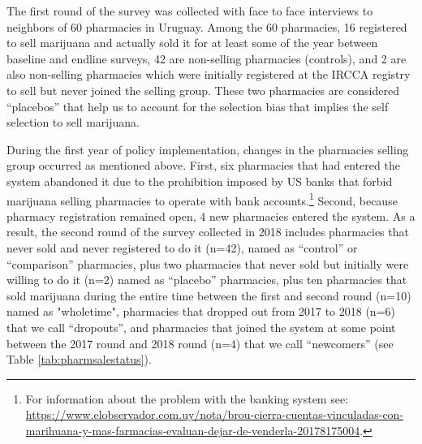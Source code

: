\documentclass[11pt]{article}
\begin{document}
The first round of the survey was collected with face to face interviews to neighbors of 60 pharmacies in Uruguay. Among the 60 pharmacies, 16 registered to sell marijuana and actually sold it for at least some of the year between baseline and endline surveys, 42 are non-selling pharmacies (controls), and 2 are also non-selling pharmacies which were initially registered at the IRCCA registry to sell but never joined the selling group. These two pharmacies are considered ``placebos'' that help us to account for the selection bias that implies the self selection to sell marijuana.

During the first  year of policy implementation, changes in the pharmacies selling group occurred as mentioned above. First, six pharmacies that had entered the system abandoned it due to the prohibition imposed by US banks that forbid marijuana selling pharmacies to operate with bank accounts.\footnote{For information about the problem with the banking system see: \url{https://www.elobservador.com.uy/nota/brou-cierra-cuentas-vinculadas-con-marihuana-y-mas-farmacias-evaluan-dejar-de-venderla-20178175004}.} Second,  because pharmacy registration remained open, 4 new pharmacies entered the system. As a result, the second round of the survey collected in 2018 includes pharmacies that never sold and never registered to do it (n=42), named as ``control'' or ``comparison'' pharmacies, plus two pharmacies that never sold but initially were willing to do it (n=2) named as ``placebo'' pharmacies, plus ten pharmacies that sold marijuana during the entire time between the first and second round (n=10) named as "wholetime", pharmacies that dropped out from 2017 to 2018 (n=6) that we call ``dropouts'', and pharmacies that joined the system at some point between the 2017 round and 2018 round (n=4) that we call ``newcomers'' (see Table \ref{tab:pharmsalestatus}).
\end{document}
